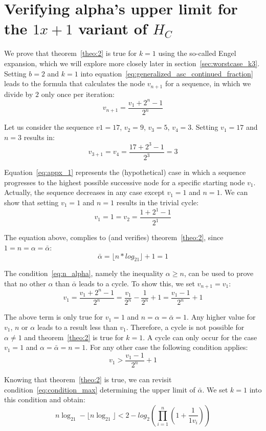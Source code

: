 \section{Verifying alpha's upper limit for the $1x+1$ variant of $H_C$}
We prove that theorem~\ref{theo:2} is true for $k=1$ using the so-called Engel expansion, which we will explore more closely later in section~\ref{sec:worstcase_k3}. Setting $b=2$ and $k=1$ into equation~\ref{eq:generalized_asc_continued_fraction} leads to the formula that calculates the node $v_{n+1}$ for a sequence, in which we divide by $2$ only once per iteration:
\begin{equation}
\label{eq:appx_1}
v_{n+1}=\frac{v_1+2^n-1}{2^n}
\end{equation}

\begin{example}
	Let us consider the sequence $v1=17$, $v_2=9$, $v_3=5$, $v_4=3$. Setting $v_1=17$ and $n=3$ results in:
	\[
	v_{3+1}=v_4=\frac{17+2^3-1}{2^3}=3
	\]
\end{example}

Equation~\ref{eq:appx_1} represents the (hypothetical) case in which a sequence progresses to the highest possible successive node for a specific starting node $v_1$. Actually, the sequence decreases in any case except $v_1=1$ and $n=1$. We can show that setting $v_1=1$ and $n=1$ results in the trivial cycle:
\[
v_1=1=v_2=\frac{1+2^1-1}{2^1}
\]

The equation above, complies to (and verifies) theorem~\ref{theo:2}, since $1=n=\alpha=\bar\alpha$:
\[
\bar\alpha=\lfloor n*log_21\rfloor+1=1
\]

The condition~\ref{eq:n_alpha}, namely the inequality $\alpha\ge n$, can be used to prove that no other $\alpha$ than $\bar\alpha$ leads to a cycle. To show this, we set $v_{n+1}=v_1$:
\[
v_1=\frac{v_1+2^n-1}{2^n}=\frac{v_1}{2^n}-\frac{1}{2^n}+1=\frac{v_1-1}{2^n}+1
\]

The above term is only true for $v_1=1$ and $n=\alpha=\bar\alpha=1$. Any higher value for $v_1$, $n$ or $\alpha$ leads to a result less than $v_1$. Therefore, a cycle is not possible for $\alpha\ne 1$ and theorem~\ref{theo:2} is true for $k=1$. A cycle can only occur for the case $v_1=1$ and $\alpha=\bar\alpha=n=1$. For any other case the following condition applies:
\[
v_1>\frac{v_1-1}{2^n}+1
\]

Knowing that theorem~\ref{theo:2} is true, we can revisit condition~\ref{eq:condition_max} determining the upper limit of $\bar\alpha$. We set $k=1$ into this condition and obtain:
\begin{equation}
n\log_21-\lfloor n\log_21\rfloor<2-log_2\left(\prod_{i=1}^{n}\left(1+\frac{1}{1v_{i}}\right)\right)
\end{equation}

